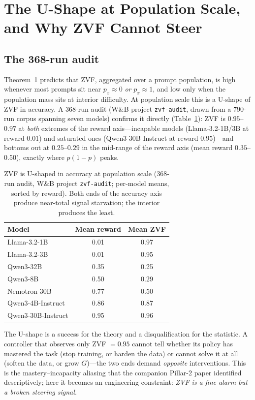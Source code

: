 \section{The U-Shape at Population Scale, and Why ZVF Cannot Steer}
\label{sec:p7-ushape}

\subsection{The 368-run audit}
\label{sec:p7-audit}
Theorem~1 predicts that ZVF, aggregated over a prompt population, is high
whenever most prompts sit near $p_x \approx 0$ \emph{or} $p_x \approx 1$, and
low only when the population mass sits at interior difficulty. At population
scale this is a U-shape of ZVF in accuracy. A 368-run audit (W\&B project
\texttt{zvf-audit}, drawn from a 790-run corpus spanning seven models)
confirms it directly (Table~\ref{tab:p7-ushape}): ZVF is
$0.95$--$0.97$ at \emph{both} extremes of the reward axis---incapable models
(Llama-3.2-1B/3B at reward $0.01$) and saturated ones (Qwen3-30B-Instruct at
reward $0.95$)---and bottoms out at $0.25$--$0.29$ in the mid-range of the
reward axis (mean reward $0.35$--$0.50$), exactly where $p(1-p)$ peaks.

\begin{table}[t]
\centering
\caption{ZVF is U-shaped in accuracy at population scale (368-run audit,
W\&B project \texttt{zvf-audit}; per-model means, sorted by reward). Both
ends of the accuracy axis produce near-total signal starvation; the
interior produces the least.}
\label{tab:p7-ushape}
\begin{tabular}{lcc}
\toprule
Model & Mean reward & Mean ZVF \\
\midrule
Llama-3.2-1B        & 0.01 & 0.97 \\
Llama-3.2-3B        & 0.01 & 0.95 \\
Qwen3-32B           & 0.35 & 0.25 \\
Qwen3-8B            & 0.50 & 0.29 \\
Nemotron-30B        & 0.77 & 0.50 \\
Qwen3-4B-Instruct   & 0.86 & 0.87 \\
Qwen3-30B-Instruct  & 0.95 & 0.96 \\
\bottomrule
\end{tabular}
\end{table}

The U-shape is a success for the theory and a disqualification for the
statistic. A controller that observes only ZVF $= 0.95$ cannot tell whether
its policy has mastered the task (stop training, or harden the data) or
cannot solve it at all (soften the data, or grow $G$)---the two ends demand
\emph{opposite} interventions. This is the mastery--incapacity aliasing that
the companion Pillar-2 paper identified descriptively; here it becomes an
engineering constraint: \emph{ZVF is a fine alarm but a broken steering
signal.}

